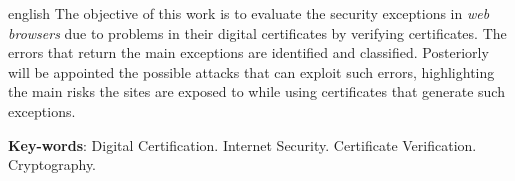\begin{resumo}[Abstract]
 \begin{otherlanguage*}{english}
	The objective of this work is to evaluate the security exceptions in \textit{web browsers} due to problems in their digital certificates by verifying certificates. The errors that return the main exceptions are identified and classified.  Posteriorly will be appointed the possible attacks that can exploit such errors, highlighting the main risks the sites are exposed to while using certificates that generate such exceptions.

   \vspace{\onelineskip}
 
   \noindent 
   \textbf{Key-words}: Digital Certification. Internet Security. Certificate Verification. Cryptography. 
 \end{otherlanguage*}
\end{resumo}
